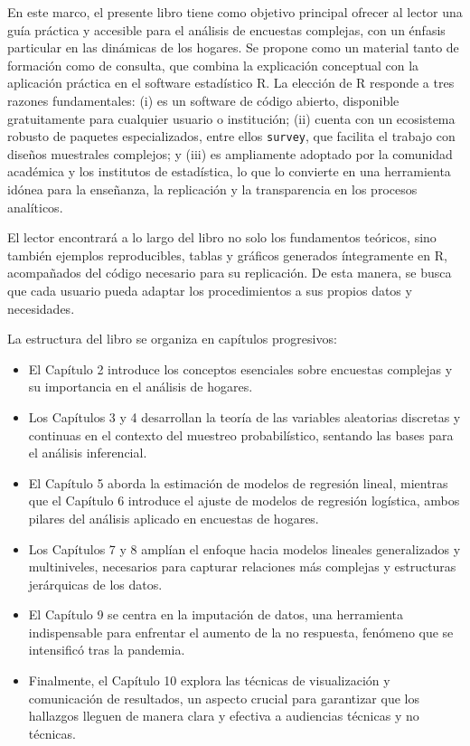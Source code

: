 \documentclass[
  12pt,
]{book}
\providecommand{\tightlist}{%
  \setlength{\itemsep}{0pt}\setlength{\parskip}{0pt}}
\begin{document}
En este marco, el presente libro tiene como objetivo principal ofrecer al lector una guía práctica y accesible para el análisis de encuestas complejas, con un énfasis particular en las dinámicas de los hogares. Se propone como un material tanto de formación como de consulta, que combina la explicación conceptual con la aplicación práctica en el software estadístico R. La elección de R responde a tres razones fundamentales: (i) es un software de código abierto, disponible gratuitamente para cualquier usuario o institución; (ii) cuenta con un ecosistema robusto de paquetes especializados, entre ellos \texttt{survey}, que facilita el trabajo con diseños muestrales complejos; y (iii) es ampliamente adoptado por la comunidad académica y los institutos de estadística, lo que lo convierte en una herramienta idónea para la enseñanza, la replicación y la transparencia en los procesos analíticos.

El lector encontrará a lo largo del libro no solo los fundamentos teóricos, sino también ejemplos reproducibles, tablas y gráficos generados íntegramente en R, acompañados del código necesario para su replicación. De esta manera, se busca que cada usuario pueda adaptar los procedimientos a sus propios datos y necesidades.

La estructura del libro se organiza en capítulos progresivos:

\begin{itemize}
\tightlist
\item
  El Capítulo 2 introduce los conceptos esenciales sobre encuestas complejas y su importancia en el análisis de hogares.
\item
  Los Capítulos 3 y 4 desarrollan la teoría de las variables aleatorias discretas y continuas en el contexto del muestreo probabilístico, sentando las bases para el análisis inferencial.
\item
  El Capítulo 5 aborda la estimación de modelos de regresión lineal, mientras que el Capítulo 6 introduce el ajuste de modelos de regresión logística, ambos pilares del análisis aplicado en encuestas de hogares.
\item
  Los Capítulos 7 y 8 amplían el enfoque hacia modelos lineales generalizados y multiniveles, necesarios para capturar relaciones más complejas y estructuras jerárquicas de los datos.
\item
  El Capítulo 9 se centra en la imputación de datos, una herramienta indispensable para enfrentar el aumento de la no respuesta, fenómeno que se intensificó tras la pandemia.
\item
  Finalmente, el Capítulo 10 explora las técnicas de visualización y comunicación de resultados, un aspecto crucial para garantizar que los hallazgos lleguen de manera clara y efectiva a audiencias técnicas y no técnicas.
\end{itemize}
\end{document}
